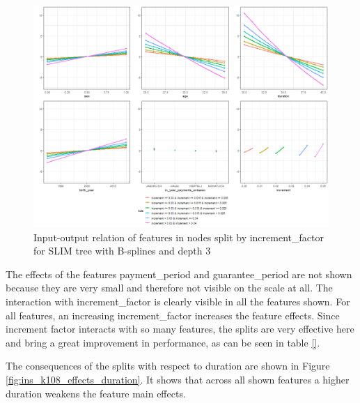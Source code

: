 \begin{figure}[!htb]
    \centering    
    \includegraphics[width=16cm]{Figures/insurance_use_case/k1_08_BPV/effects_increment_factor.png}
    \caption{Input-output relation of features in nodes split by increment\_factor for SLIM tree with B-splines and depth 3}
    \label{fig:ins_k108_effects_increment}
\end{figure}

The effects of the features payment\_period and guarantee\_period are not shown because they are very small and therefore not visible on the scale at all.
The interaction with increment\_factor is clearly visible in all the features shown. For all features, an increasing increment\_factor increases the feature effects. Since increment factor interacts with so many features, the splits are very effective here and bring a great improvement in performance, as can be seen in table \ref{}.

The consequences of the splits with respect to duration are shown in Figure \ref{fig:ins_k108_effects_duration}. It shows that across all shown features a higher duration weakens the feature main effects.

